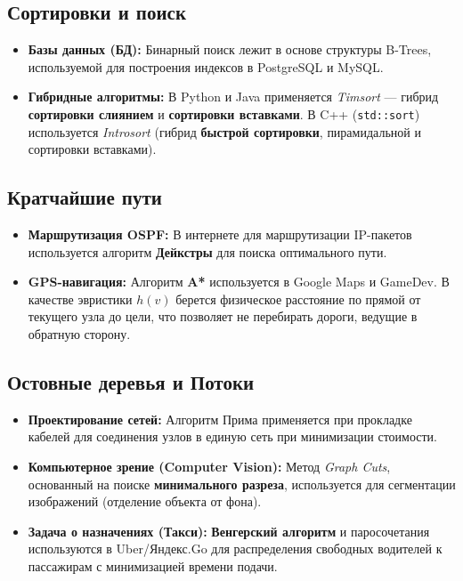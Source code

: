 \documentclass[12pt, a4paper]{article}
\begin{document}
\subsection{Сортировки и поиск}
\begin{itemize}
    \item \textbf{Базы данных (БД):} Бинарный поиск лежит в основе структуры B-Trees, используемой для построения индексов в PostgreSQL и MySQL.
    \item \textbf{Гибридные алгоритмы:} В Python и Java применяется \textit{Timsort} --- гибрид \textbf{сортировки слиянием} и \textbf{сортировки вставками}. В C++ (\texttt{std::sort}) используется \textit{Introsort} (гибрид \textbf{быстрой сортировки}, пирамидальной и сортировки вставками).
\end{itemize}

\subsection{Кратчайшие пути}
\begin{itemize}
    \item \textbf{Маршрутизация OSPF:} В интернете для маршрутизации IP-пакетов используется алгоритм \textbf{Дейкстры} для поиска оптимального пути.
    \item \textbf{GPS-навигация:} Алгоритм \textbf{A*} используется в Google Maps и GameDev. В качестве эвристики $h(v)$ берется физическое расстояние по прямой от текущего узла до цели, что позволяет не перебирать дороги, ведущие в обратную сторону.
\end{itemize}

\subsection{Остовные деревья и Потоки}
\begin{itemize}
    \item \textbf{Проектирование сетей:} Алгоритм Прима применяется при прокладке кабелей для соединения узлов в единую сеть при минимизации стоимости.
    \item \textbf{Компьютерное зрение (Computer Vision):} Метод \textit{Graph Cuts}, основанный на поиске \textbf{минимального разреза}, используется для сегментации изображений (отделение объекта от фона).
    \item \textbf{Задача о назначениях (Такси):} \textbf{Венгерский алгоритм} и паросочетания используются в Uber/Яндекс.Go для распределения свободных водителей к пассажирам с минимизацией времени подачи.
\end{itemize}
\end{document}
